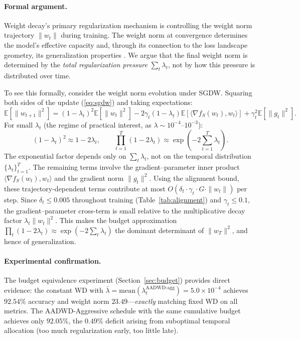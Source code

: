 \documentclass{article}
\begin{document}
\paragraph{Formal argument.}
Weight decay's primary regularization mechanism is controlling the weight norm
trajectory $\|w_t\|$ during training.
The weight norm at convergence determines the model's effective capacity and, through
its connection to the loss landscape geometry, its generalization properties
\citep{neyshabur2015norm, bartlett2017spectrally}.
We argue that the final weight norm is determined by the \emph{total regularization
pressure} $\sum_t \lambda_t$, not by how this pressure is distributed over time.

To see this formally, consider the weight norm evolution under SGDW.
Squaring both sides of the update (\ref{eq:sgdw}) and taking expectations:
\begin{equation}
  \mathbb{E}[\|w_{t+1}\|^2]
  = (1 - \lambda_t)^2 \mathbb{E}[\|w_t\|^2]
    - 2\gamma_t(1-\lambda_t)\mathbb{E}[\langle \nabla f_S(w_t), w_t \rangle]
    + \gamma_t^2 \mathbb{E}[\|g_t\|^2].
\end{equation}
For small $\lambda_t$ (the regime of practical interest, as
$\lambda \sim 10^{-4}$--$10^{-3}$):
\begin{equation}
  (1 - \lambda_t)^2 \approx 1 - 2\lambda_t, \qquad
  \prod_{t=1}^T (1 - 2\lambda_t) \approx \exp\!\left(-2\sum_{t=1}^T \lambda_t\right).
\end{equation}
The exponential factor depends only on $\sum_t \lambda_t$, not on the temporal
distribution $\{\lambda_t\}_{t=1}^T$.
The remaining terms involve the gradient--parameter inner product
$\langle \nabla f_S(w_t), w_t \rangle$ and the gradient norm $\|g_t\|^2$.
Using the alignment bound, these trajectory-dependent terms contribute at most
$O(\delta_t \cdot \gamma_t \cdot G \cdot \|w_t\|)$ per step.
Since $\delta_t \leq 0.005$ throughout training (Table~\ref{tab:alignment}) and
$\gamma_t \leq 0.1$, the gradient--parameter cross-term is small relative to the
multiplicative decay factor $\lambda_t \|w_t\|^2$.
This makes the budget approximation
$\prod_t(1 - 2\lambda_t) \approx \exp(-2\sum_t \lambda_t)$
the dominant determinant of $\|w_T\|^2$, and hence of generalization.

\paragraph{Experimental confirmation.}
The budget equivalence experiment (Section~\ref{sec:budget}) provides direct
evidence: the constant WD with
$\bar{\lambda} = \text{mean}(\lambda_t^{\text{AADWD-agg}}) = 5.0 \times 10^{-4}$
achieves $92.54\%$ accuracy and weight norm $23.49$---\emph{exactly} matching fixed
WD on all metrics.
The AADWD-Aggressive schedule with the same cumulative budget achieves only $92.05\%$,
the $0.49\%$ deficit arising from suboptimal temporal allocation (too much
regularization early, too little late).
\end{document}

